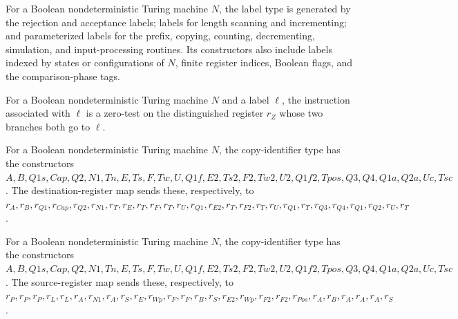 \begin{definition}
\label{Complexity.Codec.Lab}
\leanok
{}
For a Boolean nondeterministic Turing machine $N$, the label type is generated by the
rejection and acceptance labels; labels for length scanning and incrementing; and
parameterized labels for the prefix, copying, counting, decrementing, simulation, and
input-processing routines. Its constructors also include labels indexed by states or
configurations of $N$, finite register indices, Boolean flags, and the comparison-phase
tags.
\end{definition}

\begin{definition}
\label{Complexity.Codec.goto}
\leanok
{}
For a Boolean nondeterministic Turing machine $N$ and a label $\ell$, the instruction
associated with $\ell$ is a zero-test on the distinguished register $r_Z$ whose two
branches both go to $\ell$.
\end{definition}

\begin{definition}
\label{Complexity.Codec.cpDst}
\leanok
{}
For a Boolean nondeterministic Turing machine $N$, the copy-identifier type has the
constructors
$A,B,Q1s,Cap,Q2,N1,Tn,E,Ts,F,Tw,U,Q1f,E2,Ts2,F2,Tw2,U2,Q1f2,Tpos,Q3,Q4,Q1a,Q2a,Uc,Tsc$.
The destination-register map sends these, respectively, to
$r_A,r_B,r_{Q1},r_{Cap},r_{Q2},r_{N1},r_T,r_E,r_T,r_F,r_T,r_U,r_{Q1},r_{E2},r_T,r_{F2},r_T,r_U,r_{Q1},r_T,r_{Q3},r_{Q4},r_{Q1},r_{Q2},r_U,r_T$.
\end{definition}

\begin{definition}
\label{Complexity.Codec.cpSrc}
\leanok
{}
For a Boolean nondeterministic Turing machine $N$, the copy-identifier type has the
constructors
$A,B,Q1s,Cap,Q2,N1,Tn,E,Ts,F,Tw,U,Q1f,E2,Ts2,F2,Tw2,U2,Q1f2,Tpos,Q3,Q4,Q1a,Q2a,Uc,Tsc$.
The source-register map sends these, respectively, to
$r_P,r_P,r_P,r_L,r_L,r_A,r_{N1},r_A,r_S,r_E,r_{Wp},r_F,r_F,r_B,r_S,r_{E2},r_{Wp},r_{F2},r_{F2},r_{Pos},r_A,r_B,r_A,r_A,r_A,r_S$.
\end{definition}

